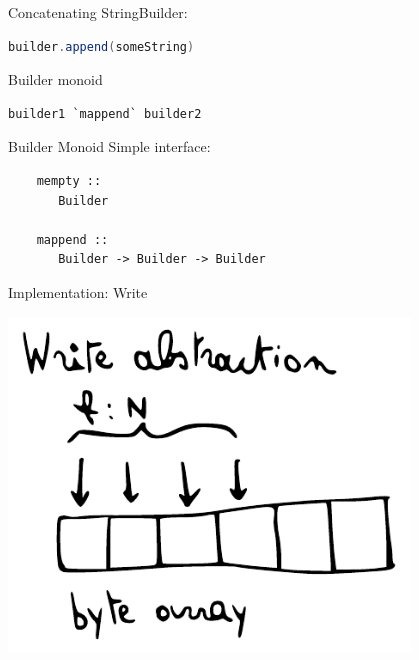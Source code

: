 \documentclass[20pt]{beamer}
\newcommand{\vspaced}{
    \vspace{5mm}
}
\begin{document}
\begin{frame}[fragile]{Concatenating}
    StringBuilder:
    \begin{lstlisting}[language=Java]
    builder.append(someString)
    \end{lstlisting}
    \vspaced

    Builder monoid
    \begin{lstlisting}[language=Java]
    builder1 `mappend` builder2
    \end{lstlisting}
\end{frame}

\begin{frame}[fragile]{Builder Monoid}
    Simple interface:
    \vspaced
    \begin{lstlisting}
    mempty ::
       Builder

    mappend ::
       Builder -> Builder -> Builder
    \end{lstlisting}
\end{frame}

\begin{frame}{Implementation: Write}
    \begin{center}
    \includegraphics[width=0.8\textwidth]{images/write.pdf}
    \end{center}
\end{frame}
\end{document}
